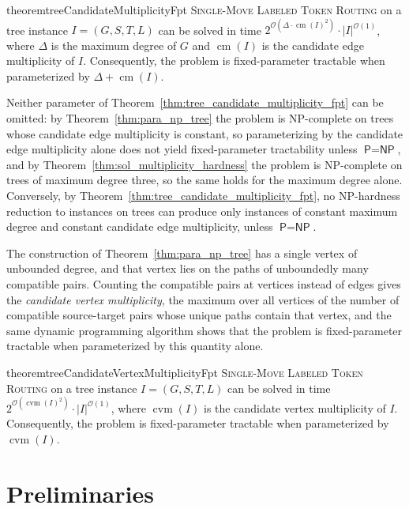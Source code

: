 \documentclass[a4paper,USenglish,thm-restate]{lipics-v2021}
\newcommand{\cm}{\operatorname{cm}}
\newcommand{\cvm}{\operatorname{cvm}}
\theoremstyle{problemstyle}
\begin{document}
\begin{restatable}{theorem}{treeCandidateMultiplicityFpt}
\label{thm:tree_candidate_multiplicity_fpt}
\textsc{Single-Move Labeled Token Routing} on a tree instance $I=(G,S,T,L)$ can
be solved in time $2^{\mathcal{O}(\Delta\cdot \cm(I)^2)}\cdot |I|^{\mathcal{O}(1)}$,
where $\Delta$ is the maximum degree of $G$ and $\cm(I)$ is the candidate edge
multiplicity of $I$. Consequently, the problem is fixed-parameter tractable when
parameterized by $\Delta+\cm(I)$.
\end{restatable}

Neither parameter of Theorem~\ref{thm:tree_candidate_multiplicity_fpt} can be
omitted: by Theorem~\ref{thm:para_np_tree} the problem is
\textsf{NP}-complete on trees whose candidate edge multiplicity is constant,
so parameterizing by the candidate edge multiplicity alone does not yield
fixed-parameter tractability unless $\textsf{P}=\textsf{NP}$, and by
Theorem~\ref{thm:sol_multiplicity_hardness} the problem is
\textsf{NP}-complete on trees of maximum degree three, so the same holds for
the maximum degree alone. Conversely, by
Theorem~\ref{thm:tree_candidate_multiplicity_fpt}, no \textsf{NP}-hardness
reduction to instances on trees can produce only instances of constant maximum
degree and constant candidate edge multiplicity, unless
$\textsf{P}=\textsf{NP}$.

The construction of Theorem~\ref{thm:para_np_tree} has a single vertex of
unbounded degree, and that vertex lies on the paths of unboundedly many
compatible pairs. Counting the compatible pairs at vertices instead of edges
gives the \emph{candidate vertex multiplicity}, the maximum over all vertices
of the number of compatible source-target pairs whose unique paths contain
that vertex, and the same dynamic programming algorithm shows that the
problem is fixed-parameter tractable when parameterized by this quantity
alone.

\begin{restatable}{theorem}{treeCandidateVertexMultiplicityFpt}
\label{thm:tree_cvm_fpt}
\textsc{Single-Move Labeled Token Routing} on a tree instance $I=(G,S,T,L)$
can be solved in time $2^{\mathcal{O}(\cvm(I)^2)}\cdot|I|^{\mathcal{O}(1)}$,
where $\cvm(I)$ is the candidate vertex multiplicity of $I$. Consequently,
the problem is fixed-parameter tractable when parameterized by $\cvm(I)$.
\end{restatable}

\section{Preliminaries}
\label{sec:prelim}
\end{document}

